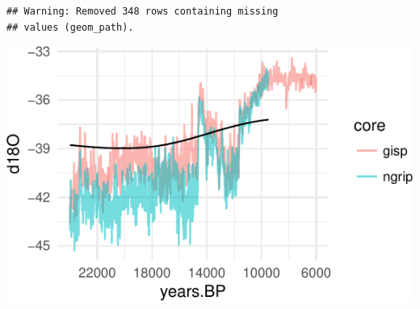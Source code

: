 \documentclass[11pt,]{tufte-handout}
\begin{document}
\begin{verbatim}
## Warning: Removed 348 rows containing missing
## values (geom_path).
\end{verbatim}

\includegraphics{proxymodelcomparison_files/figure-latex/unnamed-chunk-7-1}
\end{document}
